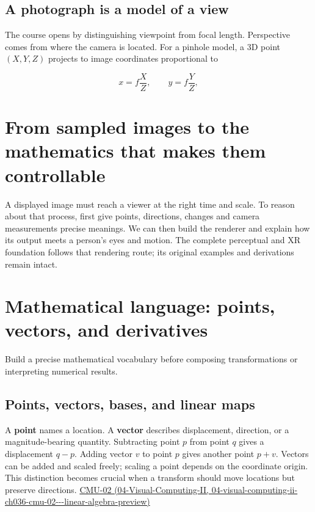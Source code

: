 \subsection{A photograph is a model of a view}\label{03-visual-computing-i-ch001-a-photograph-is-a-model-of-a-view}

The course opens by distinguishing viewpoint from focal length. Perspective comes from where the camera is located. For a pinhole model, a 3D point \((X,Y,Z)\) projects to image coordinates proportional to

\[
x=f\frac{X}{Z},\qquad y=f\frac{Y}{Z},
\]

\section{From sampled images to the mathematics that makes them controllable}\label{03-visual-computing-i-ch001-from-sampled-images-to-the-mathematics-that-makes-them-controllable}

A displayed image must reach a viewer at the right time and scale. To reason about that process, first give points, directions, changes and camera measurements precise meanings. We can then build the renderer and explain how its output meets a person's eyes and motion. The complete perceptual and XR foundation follows that rendering route; its original examples and derivations remain intact.

\section{Mathematical language: points, vectors, and derivatives}\label{03-visual-computing-i-ch001-mathematical-language-points-vectors-and-derivatives}

Build a precise mathematical vocabulary before composing transformations or interpreting numerical results.

\subsection{Points, vectors, bases, and linear maps}\label{03-visual-computing-i-ch001-points-vectors-bases-and-linear-maps}

A \textbf{point} names a location. A \textbf{vector} describes displacement, direction, or a magnitude-bearing quantity. Subtracting point \(p\) from point \(q\) gives a displacement \(q-p\). Adding vector \(v\) to point \(p\) gives another point \(p+v\). Vectors can be added and scaled freely; scaling a point depends on the coordinate origin. This distinction becomes crucial when a transform should move locations but preserve directions. \href{../04-Visual-Computing-II/main.pdf\#nameddest=04-visual-computing-ii-ch036-cmu-02---linear-algebra-preview}{CMU-02 (04-Visual-Computing-II, 04-visual-computing-ii-ch036-cmu-02-\/-\/-linear-algebra-preview)}

